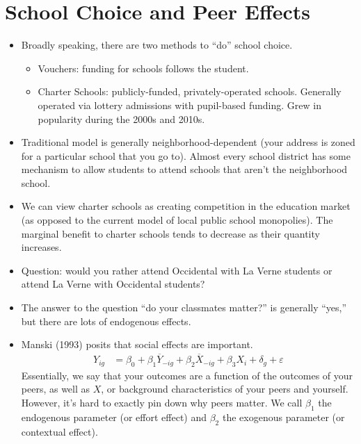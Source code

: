 \documentclass[10pt]{extarticle}
\begin{document}
  \section{School Choice and Peer Effects}%
  \begin{itemize}
    \item Broadly speaking, there are two methods to ``do'' school choice.
      \begin{itemize}
        \item Vouchers: funding for schools follows the student.
        \item Charter Schools: publicly-funded, privately-operated schools. Generally operated via lottery admissions with pupil-based funding. Grew in popularity during the 2000s and 2010s.
      \end{itemize}
    \item Traditional model is generally neighborhood-dependent (your address is zoned for a particular school that you go to). Almost every school district has some mechanism to allow students to attend schools that aren't the neighborhood school.
    \item We can view charter schools as creating competition in the education market (as opposed to the current model of local public school monopolies). The marginal benefit to charter schools tends to decrease as their quantity increases.
    \item Question: would you rather attend Occidental with La Verne students or attend La Verne with Occidental students?
    \item The answer to the question ``do your classmates matter?'' is generally ``yes,'' but there are lots of endogenous effects.
    \item Manski (1993) posits that social effects are important.
      \begin{align*}
        Y_{ig} &= \beta_0 + \beta_1 \overline{Y}_{-ig} + \beta_2\overline{X}_{-ig} + \beta_3X_i + \delta_g + \varepsilon
      \end{align*}
      Essentially, we say that your outcomes are a function of the outcomes of your peers, as well as $X$, or background characteristics of your peers and yourself.\\

      However, it's hard to exactly pin down why peers matter. We call $\beta_1$ the endogenous parameter (or effort effect) and $\beta_2$ the exogenous parameter (or contextual effect).\\


\end{itemize}
\end{document}
